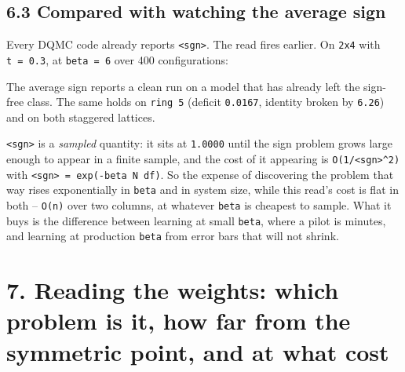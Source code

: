 \documentclass[10pt,letterpaper,twocolumn]{article}
\begin{document}
\subsection{6.3 Compared with watching the average sign}\label{63-compared-with-watching-the-average-sign}

Every DQMC code already reports \texttt{\textless{}\allowbreak{}sgn\textgreater{}\allowbreak{}}. The read fires earlier. On \texttt{2x4} with \texttt{t\textquotesingle{}\ =\allowbreak{}\ 0.\allowbreak{}3}, at
\texttt{beta\ =\allowbreak{}\ 6} over 400 configurations:


The average sign reports a clean run on a model that has already left the sign-free class. The same
holds on \texttt{ring\ 5} (deficit \texttt{0.\allowbreak{}0167}, identity broken by \texttt{6.\allowbreak{}26}) and on both staggered lattices.

\texttt{\textless{}\allowbreak{}sgn\textgreater{}\allowbreak{}} is a \emph{sampled} quantity: it sits at \texttt{1.\allowbreak{}0000} until the sign problem grows large enough to
appear in a finite sample, and the cost of it appearing is \texttt{O(\allowbreak{}1/\allowbreak{}\textless{}\allowbreak{}sgn\textgreater{}\allowbreak{}\^{}2)\allowbreak{}} with
\texttt{\textless{}\allowbreak{}sgn\textgreater{}\allowbreak{}\ =\allowbreak{}\ exp(\allowbreak{}-{}\allowbreak{}beta\ N\ df)\allowbreak{}}. So the expense of discovering the problem that way rises exponentially
in \texttt{beta} and in system size, while this read's cost is flat in both -- \texttt{O(\allowbreak{}n)\allowbreak{}} over two columns, at
whatever \texttt{beta} is cheapest to sample. What it buys is the difference between learning at small
\texttt{beta}, where a pilot is minutes, and learning at production \texttt{beta} from error bars that will not
shrink.

\section{7. Reading the weights: which problem is it, how far from the symmetric point, and at what cost}\label{7-reading-the-weights-which-problem-is-it-how-far-from-the-symmetric-point-and-at-what-cost}
\end{document}
